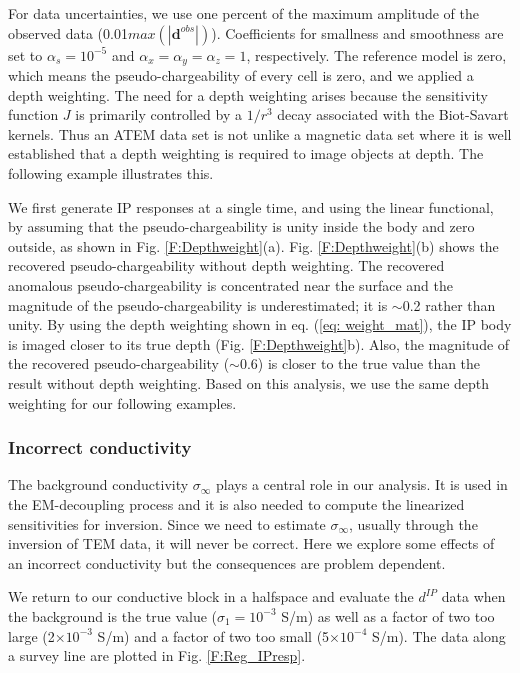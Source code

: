 \documentclass[extra,mreferee]{gji}
\newcommand{\siginf}{\sigma_\infty}
\newcommand{\dip}{d^{IP}}
\begin{document}
For data uncertainties, we use one percent of the maximum amplitude of the observed data (0.01$max(|\mathbf{d}^{obs}|)$). Coefficients for smallness and smoothness are set to $\alpha_s=10^{-5}$ and $\alpha_x=\alpha_y=\alpha_z=1$, respectively. The reference model is zero, which means the pseudo-chargeability of every cell is zero, and we applied a depth weighting. 
The need for a depth weighting arises because the sensitivity function $J$ is primarily controlled by a $1/r^3$ decay associated with the Biot-Savart kernels.  Thus an ATEM data set is not unlike a magnetic data set where it is well established that a depth weighting is required to image objects at depth. The following example illustrates this. 

We first generate IP responses at a single time, and using the linear functional, by assuming that the pseudo-chargeability is unity inside the body and zero outside, as shown in  Fig. \ref{F:Depthweight}(a). 
Fig. \ref{F:Depthweight}(b) shows the recovered pseudo-chargeability without depth weighting. 
The recovered anomalous pseudo-chargeability is concentrated  near the surface and the magnitude of the pseudo-chargeability is underestimated; it is $\sim$0.2 rather than unity. 
By using the depth weighting shown in eq. (\ref{eq: weight_mat}),  the IP body is imaged closer to its true depth (Fig. \ref{F:Depthweight}b). 
Also, the magnitude of the recovered pseudo-chargeability ($\sim$0.6) is closer to the true value than the result without depth weighting. 
Based on this analysis, we use the same depth weighting for our  following examples. 

\subsubsection{Incorrect conductivity}
\label{subsubsection: Incorrect conductivity}
The background conductivity $\siginf$ plays a central role in our analysis. It is used in the EM-decoupling process and it is also needed to compute the linearized sensitivities for inversion. Since we need to estimate $\siginf$, usually through the inversion of TEM data, it will never be correct. Here we explore some effects of an incorrect conductivity but  the consequences are problem dependent.

We return to our conductive block in a halfspace and evaluate the $\dip$ data when the background is the true value ($\sigma_1 = 10^{-3}$ S/m) as well as a factor of two too large (2$\times10^{-3}$ S/m) and a factor of two too small (5$\times10^{-4}$ S/m). The data along a survey line are plotted in Fig. \ref{F:Reg_IPresp}.
\end{document}
